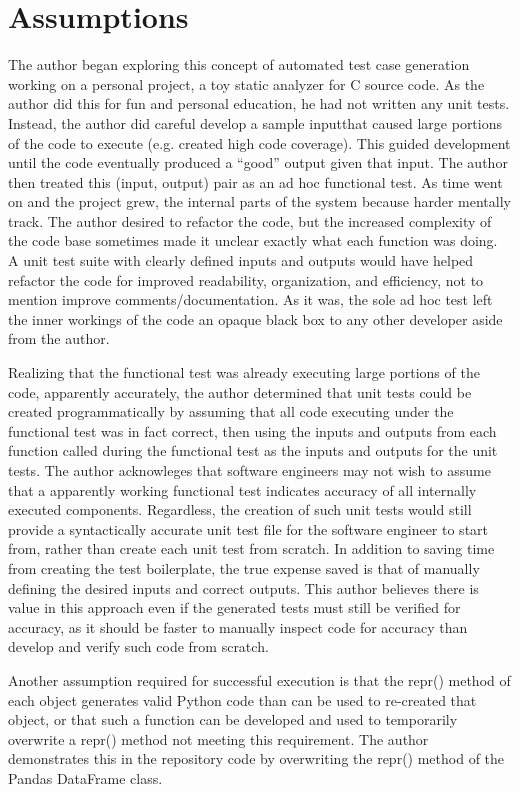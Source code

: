 \section{Assumptions}\label{sec:introduction}

The author began exploring this concept of automated test case generation
 working on a personal project, a toy static analyzer for C source code.  As the
 author did this for fun and personal education, he had not written any unit
 tests.  Instead, the author did careful develop a sample inputthat caused large
 portions of the code to execute (e.g. created high code coverage).  This guided
 development until the code eventually produced a “good” output given that input.
  The author then treated this (input, output) pair as an ad hoc functional test.
  As time went on and the project grew, the internal parts of the system because
 harder mentally track.  The author desired to refactor the code, but the
 increased complexity of the code base sometimes made it unclear exactly what
 each function was doing.  A unit test suite with clearly defined inputs and
 outputs would have helped refactor the code for improved readability,
 organization, and efficiency, not to mention improve comments/documentation.  As
 it was, the sole ad hoc test left the inner workings of the code an opaque black
 box to any other developer aside from the author.

Realizing that the functional test was already executing large portions of the
 code, apparently accurately, the author determined that unit tests could be
 created programmatically by assuming that all code executing under the
 functional test was in fact correct, then using the inputs and outputs from each
 function called during the functional test as the inputs and outputs for the
 unit tests.  The author acknowleges that software engineers may not 
 wish to assume that a apparently working functional test indicates accuracy of 
 all internally executed components. Regardless, the creation of such unit 
 tests would still provide a syntactically accurate unit
 test file for the software engineer to start from, rather than create each unit
 test from scratch.  In addition to saving time from creating the test
 boilerplate, the true expense saved is that of manually defining the desired
 inputs and correct outputs.  This author believes there is value in this
 approach even if the generated tests must still be verified for accuracy, as it
 should be faster to manually inspect code for accuracy than develop and verify
 such code from scratch.

Another assumption required for successful execution is that the repr() method
 of each object generates valid Python code than can be used to re-created that
 object, or that such a function can be developed and used to temporarily
 overwrite a repr() method not meeting this requirement.  The author demonstrates
 this in the repository code by overwriting the repr() method of the
 Pandas DataFrame class.
